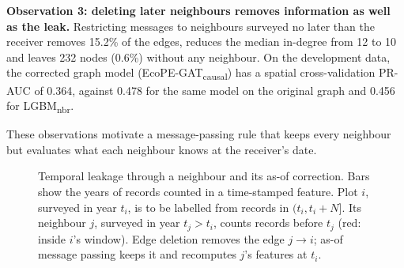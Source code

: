 \documentclass[a4paper,fleqn]{cas-sc}
\newcommand{\Mcausal}{\mbox{EcoPE-GAT\textsubscript{causal}}}
\newcommand{\Lnbr}{\mbox{LGBM\textsubscript{nbr}}}
\begin{document}
\textbf{Observation 3: deleting later neighbours removes information as well as the leak.} Restricting messages to neighbours surveyed no later than the receiver removes 15.2\% of the edges, reduces the median in-degree from 12 to 10 and leaves 232 nodes (0.6\%) without any neighbour. On the development data, the corrected graph model (\Mcausal) has a spatial cross-validation PR-AUC of 0.364, against 0.478 for the same model on the original graph and 0.456 for \Lnbr.

These observations motivate a message-passing rule that keeps every neighbour but evaluates what each neighbour knows at the receiver's date.

\begin{figure}[pos=t]
  \centering
  \resizebox{\linewidth}{!}{%
  \begin{tikzpicture}[font=\small]
    \fill[red!10] (3,-0.3) rectangle (8,2.5);
    \node[red!60!black,anchor=south] at (5.5,2.5) {prediction window of plot $i$: $(t_i,\ t_i+N]$};
    \draw[-{Stealth},thick] (0,-0.6) -- (10.2,-0.6) node[right] {year};
    \foreach \x/\lab in {0/2000,3/$t_i$,6/$t_j$,8/$t_i{+}N$} {
      \draw (\x,-0.5) -- (\x,-0.7) node[below] {\lab};
    }
    \draw[dashed,gray] (3,-0.6) -- (3,2.5);
    \draw[dashed,gray] (6,-0.6) -- (6,2.5);
    \node[anchor=east] at (-0.2,2.0) {plot $i$, own features $x_i(t_i)$};
    \draw[line width=4pt,blue!55] (0,2.0) -- (3,2.0);
    \node[anchor=east] at (-0.2,1.1) {neighbour $j$, original $x_j(t_j)$};
    \draw[line width=4pt,blue!55] (0,1.1) -- (3,1.1);
    \draw[line width=4pt,red!70] (3,1.1) -- (6,1.1);
    \node[anchor=west,red!60!black] at (6.1,1.1) {leak: records of $[t_i, t_j)$};
    \node[anchor=east] at (-0.2,0.2) {neighbour $j$, as-of $x_j(t_i)$};
    \draw[line width=4pt,blue!55] (0,0.2) -- (3,0.2);
    \node[anchor=west] at (3.1,0.2) {records before $t_i$ only; edge $j \to i$ kept};
  \end{tikzpicture}}
  \caption{Temporal leakage through a neighbour and its as-of correction. Bars show the years of records counted in a time-stamped feature. Plot $i$, surveyed in year $t_i$, is to be labelled from records in $(t_i, t_i+N]$. Its neighbour $j$, surveyed in year $t_j > t_i$, counts records before $t_j$ (red: inside $i$'s window). Edge deletion removes the edge $j \to i$; as-of message passing keeps it and recomputes $j$'s features at $t_i$.}
  \label{fig:leak}
\end{figure}
\end{document}
